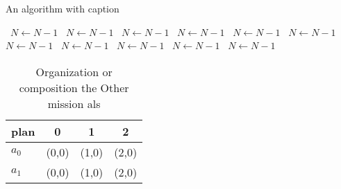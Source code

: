 \documentclass[a4paper]{article}
\begin{document}
\begin{algorithm}
\caption{An algorithm with caption}
\begin{algorithmic}
\    \State $N \gets N - 1$
\    \State $N \gets N - 1$
\    \State $N \gets N - 1$
\    \State $N \gets N - 1$
\    \State $N \gets N - 1$
\    \State $N \gets N - 1$
\    \State $N \gets N - 1$
\    \State $N \gets N - 1$
\    \State $N \gets N - 1$
\    \State $N \gets N - 1$
\    \State $N \gets N - 1$
\EndWhile
\end{algorithmic}
\end{algorithm}

\begin{table}
\begin{adjustbox}{width=0.6\columnwidth}
\begin{tabular}{|l|l|l|l|}
\hline
\textbf{plan} & \multicolumn{1}{c|}{\textbf{0}} & \multicolumn{1}{c|}{\textbf{1}} & \multicolumn{1}{c|}{\textbf{2}} \\ \hline
\textbf{$a_0$}  & (0,0) & (1,0) & (2,0) \\ \hline
\textbf{$a_1$}  & (0,0) & (1,0) & (2,0) \\ \hline
\end{tabular}
\end{adjustbox}
\caption{Organization or composition the Other mission als
}
\end{table}
\end{document}
